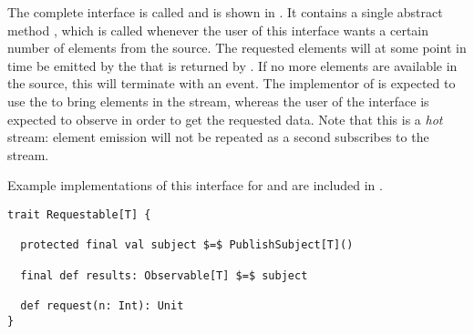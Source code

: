 The complete interface is called  and is shown in . It contains a single abstract method , which is called whenever the user of this interface wants a certain number of elements from the source. The requested elements will at some point in time be emitted by the \obs that is returned by . If no more elements are available in the source, this \obs will terminate with an  event. The implementor of  is expected to use the  to bring elements in the stream, whereas the user of the interface is expected to observe  in order to get the requested data. Note that this is a \emph{hot} stream: element emission will not be repeated as a second \obv subscribes to the stream.

Example implementations of this interface for \itr and  are included in .

\begin{minipage}{\linewidth}
\begin{lstlisting}[style=ScalaStyle, caption={Universal, interactive interface used in the feedback system}, label={lst:universal-interactive-interface}]
trait Requestable[T] {

  protected final val subject $=$ PublishSubject[T]()

  final def results: Observable[T] $=$ subject

  def request(n: Int): Unit
}
\end{lstlisting}
\end{minipage}
